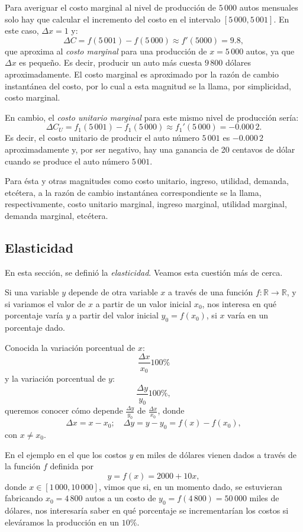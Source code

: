 Para averiguar el costo marginal al nivel de producción de $5\,000$ autos mensuales solo hay que
calcular el incremento del costo en el intervalo $[5\,000, 5\,001]$. En este caso, $\Delta x=1$ y:
\[
\Delta C  = f(5\,001)-f(5\,000) \approx f'(5000) = 9.8,
\]
que aproxima al \emph{costo marginal} para una producción de $x=5\,000$ autos, ya que $\Delta x$ es
pequeño. Es decir, producir un auto más cuesta $9\,800$ dólares aproximadamente. El costo marginal es aproximado por la razón de cambio instantánea del costo, por lo cual a esta magnitud se la llama, por simplicidad, costo marginal.

En cambio, el \emph{costo unitario marginal} para este mismo nivel de producción sería:
\[
\Delta C_U  = f_1(5\,001)-f_1(5\,000)\approx f_1'(5\,000) = -0.000\,2.
\]
Es decir, el costo unitario de producir el auto número $5\,001$ es $-0.000\,2$
aproximadamente y, por ser negativo, hay una ganancia de 20 centavos de dólar cuando se produce el
auto número $5\,001$.

Para ésta y otras magnitudes como costo unitario, ingreso, utilidad, demanda, etcétera, a la razón de cambio instantánea
correspondiente se la llama, respectivamente, costo unitario marginal, ingreso marginal, utilidad marginal, demanda
marginal, etcétera.

\subsection{Elasticidad}
En esta sección, se definió la \emph{elasticidad}. Veamos esta cuestión más de cerca.

Si una variable $y$ depende de otra variable $x$ a través de una función $f\colon\mathbb{R}
\rightarrow\mathbb{R}$, y si variamos el valor de $x$ a partir de un valor inicial $x_{0}$, nos
interesa en qué porcentaje varía $y$ a partir del valor inicial $y_{0} = f(x_{0})$, si $x$ varía en
un porcentaje dado.

Conocida la variación porcentual de $x$:
\[
\frac{\Delta x}{x_{0}}100\%
\]
y la variación porcentual de $y$:
\[
\frac{\Delta y}{y_{0}}100\%,
\]
queremos conocer cómo depende $\frac{\Delta y}{y_{0}}$ de $\frac{\Delta x}{x_{0}}$, donde
\[
\Delta x = x - x_{0}; \quad \Delta y = y - y_0 = f(x) - f(x_{0}),
\]
con $x\neq x_{0}$.

En el ejemplo en el que los costos $y$ en miles de dólares vienen dados a través de la función $f$
definida por
\[
y = f(x) = 2000 + 10x,
\]
donde $x\in[1\,000, 10\,000]$, vimos que si, en un momento dado, se estuvieran fabricando $x_{0} =
4\,800$ autos a un costo de $y_{0} = f(4\,800) = 50\,000$ miles de dólares, nos interesaría saber
en qué porcentaje se incrementarían los costos si eleváramos la producción en un $10\%$.

